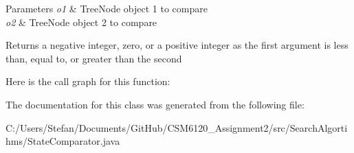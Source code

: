 \begin{DoxyParams}{Parameters}
{\em o1} & Tree\+Node object 1 to compare \\
\hline
{\em o2} & Tree\+Node object 2 to compare \\
\hline
\end{DoxyParams}
\begin{DoxyReturn}{Returns}
a negative integer, zero, or a positive integer as the first argument is less than, equal to, or greater than the second 
\end{DoxyReturn}


Here is the call graph for this function\+:




The documentation for this class was generated from the following file\+:\begin{DoxyCompactItemize}
\item 
C\+:/\+Users/\+Stefan/\+Documents/\+Git\+Hub/\+C\+S\+M6120\+\_\+\+Assignment2/src/\+Search\+Algortihms/State\+Comparator.\+java\end{DoxyCompactItemize}
